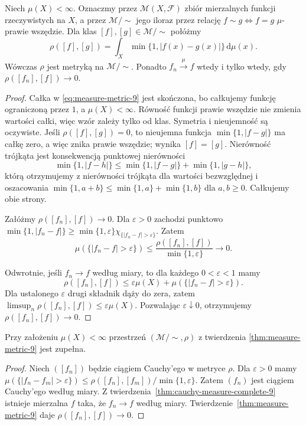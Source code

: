 \begin{twierdzenie}
\label{thm:measure-metric-9}
Niech $\mu(X)<\infty$. Oznaczmy przez
$\mathcal M(X,\mathcal F)$ zbiór mierzalnych funkcji
rzeczywistych na $X$, a przez $\mathcal M/\!\sim$
jego iloraz przez relację
$f\sim g\Longleftrightarrow f=g$ $\mu$-prawie wszędzie.
Dla klas $[f],[g]\in\mathcal M/\!\sim$ połóżmy
\begin{equation}\label{eq:measure-metric-9}
\rho([f],[g])=
\int_X\min\{1,|f(x)-g(x)|\}\,\mathrm d\mu(x).
\end{equation}
Wówczas $\rho$ jest metryką na $\mathcal M/\!\sim$.
Ponadto $f_n\xrightarrow{\mu}f$ wtedy i tylko wtedy,
gdy $\rho([f_n],[f])\to0$.
\end{twierdzenie}
\begin{proof}
Całka w \eqref{eq:measure-metric-9} jest skończona,
bo całkujemy funkcję ograniczoną przez $1$,
a $\mu(X)<\infty$. Równość funkcji prawie
wszędzie nie zmienia wartości całki, więc wzór
zależy tylko od klas. Symetria i nieujemność
są oczywiste. Jeśli $\rho([f],[g])=0$, to
nieujemna funkcja $\min\{1,|f-g|\}$ ma całkę
zero, a więc znika prawie wszędzie; wynika
$[f]=[g]$. Nierówność trójkąta jest konsekwencją
punktowej nierówności
\[
\min\{1,|f-h|\}\le
\min\{1,|f-g|\}+\min\{1,|g-h|\},
\]
którą otrzymujemy z nierówności trójkąta dla
wartości bezwzględnej i oszacowania
$\min\{1,a+b\}\le\min\{1,a\}+\min\{1,b\}$
dla $a,b\ge0$. Całkujemy obie strony.

Załóżmy $\rho([f_n],[f])\to0$. Dla $\varepsilon>0$
zachodzi punktowo
$\min\{1,|f_n-f|\}\ge
\min\{1,\varepsilon\}\chi_{\{|f_n-f|>\varepsilon\}}$.
Zatem
\[
\mu(\{|f_n-f|>\varepsilon\})\le
\frac{\rho([f_n],[f])}{\min\{1,\varepsilon\}}
\longrightarrow0.
\]

Odwrotnie, jeśli $f_n\to f$ według miary,
to dla każdego $0<\varepsilon<1$ mamy
\[
\rho([f_n],[f])\le\varepsilon\mu(X)+
\mu(\{|f_n-f|>\varepsilon\}).
\]
Dla ustalonego $\varepsilon$ drugi składnik
dąży do zera, zatem
$\limsup_n\rho([f_n],[f])\le\varepsilon\mu(X)$.
Pozwalając $\varepsilon\downarrow0$, otrzymujemy
$\rho([f_n],[f])\to0$.
\end{proof}

\begin{wniosek}
\label{cor:measure-metric-complete-9}
Przy założeniu $\mu(X)<\infty$ przestrzeń
$(\mathcal M/\!\sim,\rho)$ z twierdzenia
\ref{thm:measure-metric-9} jest zupełna.
\end{wniosek}
\begin{proof}
Niech $([f_n])$ będzie ciągiem Cauchy'ego w metryce
$\rho$. Dla $\varepsilon>0$ mamy
$\mu(\{|f_n-f_m|>\varepsilon\})\le
\rho([f_n],[f_m])/\min\{1,\varepsilon\}$.
Zatem $(f_n)$ jest ciągiem Cauchy'ego według miary.
Z twierdzenia~\ref{thm:cauchy-measure-complete-9}
istnieje mierzalna $f$ taka, że $f_n\to f$
według miary. Twierdzenie~\ref{thm:measure-metric-9}
daje $\rho([f_n],[f])\to0$.
\end{proof}

